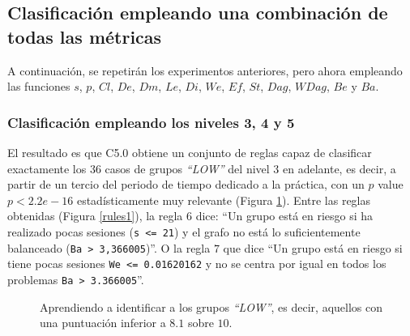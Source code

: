 \subsection{Clasificación empleando una combinación de todas las métricas}

A continuación, se repetirán los experimentos anteriores, pero ahora empleando las funciones $s$, $p$, $Cl$, $De$, $Dm$, $Le$, $Di$, $We$, $Ef$, $St$, $Dag$, $WDag$, $Be$ y $Ba$.

\subsubsection{Clasificación empleando los niveles 3, 4 y 5}

El resultado es que C5.0 obtiene un conjunto de reglas capaz de clasificar exactamente los $36$ casos de grupos \emph{``LOW''} del nivel $3$ en adelante, es decir, a partir de un tercio del periodo de tiempo dedicado a la práctica, con un $p$ value $p < 2.2e-16$ estadísticamente muy relevante (Figura \ref{fig:cm1}). Entre las reglas obtenidas (Figura \ref{rules1}), la regla $6$ dice: ``Un grupo está en riesgo si ha realizado pocas sesiones (\texttt{s <= 21}) y el grafo no está lo suficientemente balanceado (\texttt{Ba > 3,366005})''. O la regla $7$ que dice ``Un grupo está en riesgo si tiene pocas sesiones \texttt{We <= 0.01620162} y no se centra por igual en todos los problemas \texttt{Ba > 3.366005}''. %

\begin{figure}[H]
\centering
{}
\caption{Aprendiendo a identificar a los grupos \emph{``LOW''}, es decir, aquellos con una puntuación inferior a $8.1$ sobre $10$.}
\label{fig:cm1}
\end{figure}


